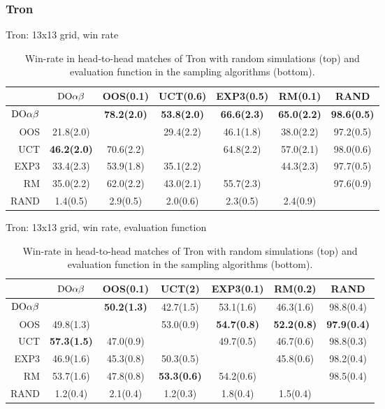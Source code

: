 
\subsubsection{Tron}

\begin{table}[t!]
\centering
\begin{scriptsize}
Tron: 13x13 grid, win rate
\begin{tabular}{|r|cccccc|}\hline
&$\textrm{DO}\alpha\beta$&OOS(0.1)&UCT(0.6)&EXP3(0.5)&RM(0.1)&RAND\\\hline
$\textrm{DO}\alpha\beta$&&\textbf{78.2(2.0)}&\textbf{53.8(2.0)}&\textbf{66.6(2.3)}&\textbf{65.0(2.2)}&\textbf{98.6(0.5)}\\
OOS&21.8(2.0)&&29.4(2.2)&46.1(1.8)&38.0(2.2)&97.2(0.5)\\
UCT&\textbf{46.2(2.0)}&70.6(2.2)&&64.8(2.2)&57.0(2.1)&98.0(0.6)\\
EXP3&33.4(2.3)&53.9(1.8)&35.1(2.2)&&44.3(2.3)&97.7(0.5)\\
RM&35.0(2.2)&62.0(2.2)&43.0(2.1)&55.7(2.3)&&97.6(0.9)\\
RAND&1.4(0.5)&2.9(0.5)&2.0(0.6)&2.3(0.5)&2.4(0.9)&\\
\hline
\end{tabular}

Tron: 13x13 grid, win rate, evaluation function
\begin{tabular}{|r|cccccc|}\hline
&$\textrm{DO}\alpha\beta$&OOS(0.1)&UCT(2)&EXP3(0.1)&RM(0.2)&RAND\\\hline
$\textrm{DO}\alpha\beta$&&\textbf{50.2(1.3)}&42.7(1.5)&53.1(1.6)&46.3(1.6)&98.8(0.4)\\
OOS&49.8(1.3)&&53.0(0.9)&\textbf{54.7(0.8)}&\textbf{52.2(0.8)}&\textbf{97.9(0.4)}\\
UCT&\textbf{57.3(1.5)}&47.0(0.9)&&49.7(0.5)&46.7(0.6)&98.8(0.3)\\
EXP3&46.9(1.6)&45.3(0.8)&50.3(0.5)&&45.8(0.6)&98.2(0.4)\\
RM&53.7(1.6)&47.8(0.8)&\textbf{53.3(0.6)}&54.2(0.6)&&98.5(0.4)\\
RAND&1.2(0.4)&2.1(0.4)&1.2(0.3)&1.8(0.4)&1.5(0.4)&\\
\hline
\end{tabular}
\end{scriptsize}
\caption{Win-rate in head-to-head matches of Tron with random simulations (top) and evaluation function in the sampling algorithms (bottom).}\label{fig:matches:tron}
\end{table}

